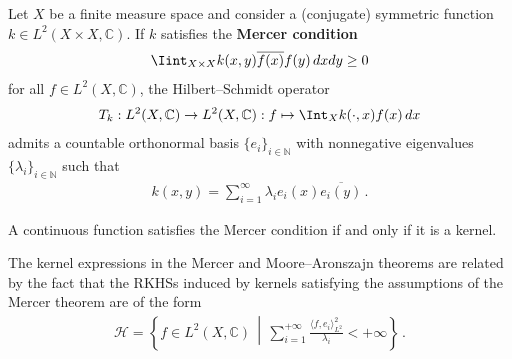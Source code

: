     \begin{theorem}[Mercer]
        Let $X$ be a finite measure space and consider a (conjugate) symmetric function $k\in L^2(X\times X,\mathbb{C})$. If $k$ satisfies the \textbf{Mercer condition}
        \begin{gather}
            \Iint_{X\times X}k(x,y)\overline{f(x)}f(y)\,dxdy\geq0
        \end{gather}
        for all $f\in L^2(X,\mathbb{C})$, the Hilbert--Schmidt operator
        \begin{gather}
            T_k:L^2(X,\mathbb{C})\rightarrow L^2(X,\mathbb{C}):f\mapsto\Int_Xk(\cdot,x)f(x)\,dx
        \end{gather}
        admits a countable orthonormal basis $\{e_i\}_{i\in\mathbb{N}}$ with nonnegative eigenvalues $\{\lambda_i\}_{i\in\mathbb{N}}$ such that
        \begin{gather}
            k(x,y) = \sum_{i=1}^\infty\lambda_ie_i(x)\overline{e_i(y)}\,.
        \end{gather}
    \end{theorem}
    \begin{theorem}[Bochner]
        A continuous function satisfies the Mercer condition if and only if it is a kernel.
    \end{theorem}


    \begin{remark}
        The kernel expressions in the Mercer and Moore--Aronszajn theorems are related by the fact that the RKHSs induced by kernels satisfying the assumptions of the Mercer theorem are of the form
        \begin{gather}
            \mathcal{H} = \left\{f\in L^2(X,\mathbb{C})\,\middle\vert\,\sum_{i=1}^{+\infty}\frac{\langle f,e_i \rangle^2_{L^2}}{\lambda_i}<+\infty\right\}\,.
        \end{gather}
    \end{remark}

